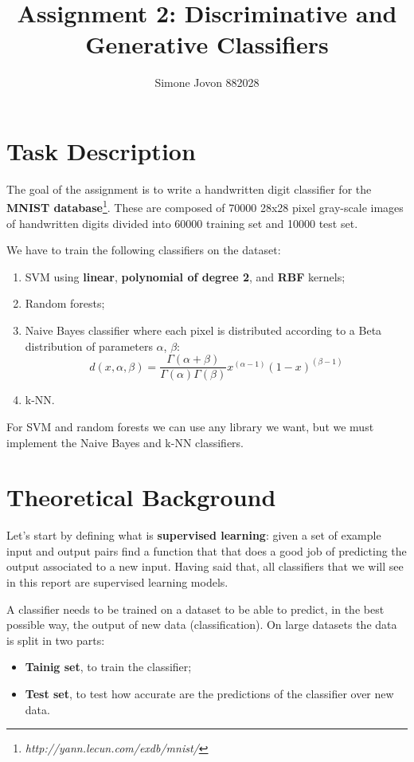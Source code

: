 \documentclass[12pt]{article}
\author{Simone Jovon 882028}
\title{Assignment 2: Discriminative and Generative Classifiers}
\begin{document}
\maketitle

\section{Task Description}

The goal of the assignment is to write a handwritten digit classifier for the 
\textbf{MNIST database}\footnote{\textit{http://yann.lecun.com/exdb/mnist/}}. 
These are composed of 70000 28x28 pixel gray-scale images 
of handwritten digits divided into 60000 training set and 10000 test set.

We have to train the following classifiers on the dataset:
\begin{enumerate}
    \item SVM  using \textbf{linear}, \textbf{polynomial of degree 2}, 
            and \textbf{RBF} kernels;
    \item Random forests;
    \item Naive Bayes classifier where each pixel is distributed according to a Beta 
          distribution of parameters $\alpha$, $\beta$:
          $$
          d(x,\alpha,\beta)=\frac{\Gamma(\alpha+\beta)}{\Gamma(\alpha)\Gamma(\beta)} x^{(\alpha-1)} (1-x)^{(\beta-1)}
          $$
    \item k-NN.
\end{enumerate}

For SVM and random forests we can use any library we want, but we must implement 
the Naive Bayes and k-NN classifiers.

\section{Theoretical Background}

Let's start by defining what is \textbf{supervised learning}: given a set of example
input and output  pairs find a function that that does a good job of predicting the
output associated to a new input. 
Having said that, all classifiers that we will see in this report are supervised 
learning models.

A classifier needs to be trained on a dataset to be able to predict, in the best
possible way, the output of new data (classification). 
On large datasets the data is split in two parts:
\begin{itemize}
    \item \textbf{Tainig set}, to train the classifier;
    \item \textbf{Test set}, to test how accurate are the predictions of the classifier
            over new data.
\end{itemize}
\end{document}
